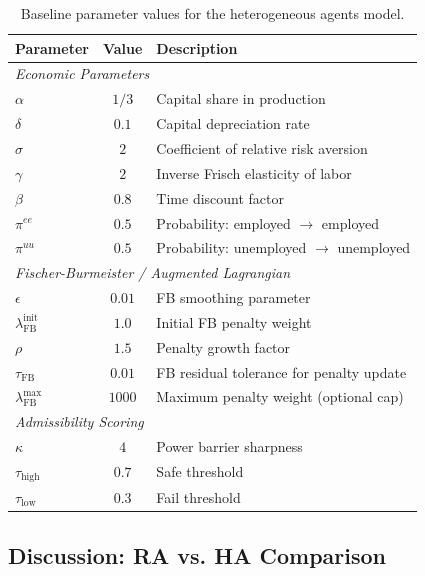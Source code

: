 \begin{table}[h]
\centering
\begin{tabular}{lcl}
\toprule
\textbf{Parameter} & \textbf{Value} & \textbf{Description} \\
\midrule
\multicolumn{3}{l}{\textit{Economic Parameters}} \\
$\alpha$ & $1/3$ & Capital share in production \\
$\delta$ & $0.1$ & Capital depreciation rate \\
$\sigma$ & $2$ & Coefficient of relative risk aversion \\
$\gamma$ & $2$ & Inverse Frisch elasticity of labor \\
$\beta$ & $0.8$ & Time discount factor \\
$\pi^{ee}$ & $0.5$ & Probability: employed $\to$ employed \\
$\pi^{uu}$ & $0.5$ & Probability: unemployed $\to$ unemployed \\
\midrule
\multicolumn{3}{l}{\textit{Fischer-Burmeister / Augmented Lagrangian}} \\
$\epsilon$ & $0.01$ & FB smoothing parameter \\
$\lambda_{\text{FB}}^{\text{init}}$ & $1.0$ & Initial FB penalty weight \\
$\rho$ & $1.5$ & Penalty growth factor \\
$\tau_{\text{FB}}$ & $0.01$ & FB residual tolerance for penalty update \\
$\lambda_{\text{FB}}^{\max}$ & $1000$ & Maximum penalty weight (optional cap) \\
\midrule
\multicolumn{3}{l}{\textit{Admissibility Scoring}} \\
$\kappa$ & $4$ & Power barrier sharpness \\
$\tau_{\text{high}}$ & $0.7$ & Safe threshold \\
$\tau_{\text{low}}$ & $0.3$ & Fail threshold \\
\bottomrule
\end{tabular}
\caption{Baseline parameter values for the heterogeneous agents model.}
\label{tab:params_ha}
\end{table}


\subsection{Discussion: RA vs. HA Comparison}

